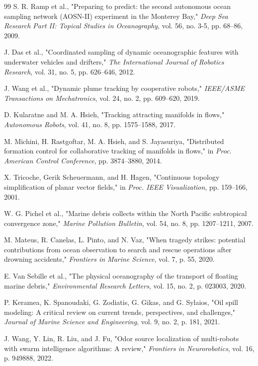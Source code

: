 \documentclass[lettersize,journal]{IEEEtran}
\begin{document}
\begin{thebibliography}{99}
 S. R. Ramp et al., "Preparing to predict: the second autonomous ocean sampling network (AOSN-II) experiment in the Monterey Bay," \textit{Deep Sea Research Part II: Topical Studies in Oceanography}, vol. 56, no. 3-5, pp. 68--86, 2009.

 J. Das et al., "Coordinated sampling of dynamic oceanographic features with underwater vehicles and drifters," \textit{The International Journal of Robotics Research}, vol. 31, no. 5, pp. 626--646, 2012.

 J. Wang et al., "Dynamic plume tracking by cooperative robots," \textit{IEEE/ASME Transactions on Mechatronics}, vol. 24, no. 2, pp. 609--620, 2019.

 D. Kularatne and M. A. Hsieh, "Tracking attracting manifolds in flows," \textit{Autonomous Robots}, vol. 41, no. 8, pp. 1575--1588, 2017.

 M. Michini, H. Rastgoftar, M. A. Hsieh, and S. Jayasuriya, "Distributed formation control for collaborative tracking of manifolds in flows," in \textit{Proc. American Control Conference}, pp. 3874--3880, 2014.

 X. Tricoche, Gerik Scheuermann, and H. Hagen, "Continuous topology simplification of planar vector fields," in \textit{Proc. IEEE Visualization}, pp. 159--166, 2001.

 W. G. Pichel et al., "Marine debris collects within the North Pacific subtropical convergence zone," \textit{Marine Pollution Bulletin}, vol. 54, no. 8, pp. 1207--1211, 2007.

 M. Mateus, R. Canelas, L. Pinto, and N. Vaz, "When tragedy strikes: potential contributions from ocean observation to search and rescue operations after drowning accidents," \textit{Frontiers in Marine Science}, vol. 7, p. 55, 2020.

 E. Van Sebille et al., "The physical oceanography of the transport of floating marine debris," \textit{Environmental Research Letters}, vol. 15, no. 2, p. 023003, 2020.

 P. Keramea, K. Spanoudaki, G. Zodiatis, G. Gikas, and G. Sylaios, "Oil spill modeling: A critical review on current trends, perspectives, and challenges," \textit{Journal of Marine Science and Engineering}, vol. 9, no. 2, p. 181, 2021.

 J. Wang, Y. Lin, R. Liu, and J. Fu, "Odor source localization of multi-robots with swarm intelligence algorithms: A review," \textit{Frontiers in Neurorobotics}, vol. 16, p. 949888, 2022.


\end{thebibliography}
\end{document}
